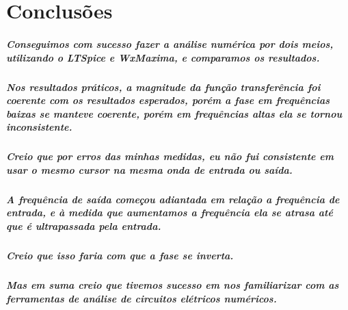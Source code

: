 \documentclass[12pt,twoside, a4paper, twocolumn]{article}
\begin{document}
\section{Conclusões}




\subparagraph*{Conseguimos com sucesso fazer a análise numérica por dois meios, utilizando o LTSpice e WxMaxima, e comparamos os resultados.}




\subparagraph*{Nos resultados práticos, a magnitude da função transferência foi coerente com os resultados esperados, porém a fase em frequências baixas se manteve coerente, porém em frequências altas ela se tornou inconsistente.}




\subparagraph*{Creio que por erros das minhas medidas, eu não fui consistente em usar o mesmo cursor na mesma onda de entrada ou saída.}




\subparagraph*{A frequência de saída começou adiantada em relação a frequência de entrada, e à medida que aumentamos a frequência ela se atrasa até que é ultrapassada pela entrada.}




\subparagraph*{Creio que isso faria com que a fase se inverta.}




\subparagraph*{Mas em suma creio que tivemos sucesso em nos familiarizar com as ferramentas de análise de circuitos elétricos numéricos.}
\end{document}

